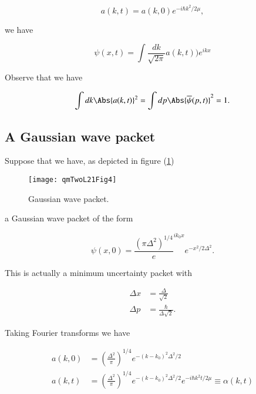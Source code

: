 \begin{equation}\label{eqn:qmTwoL21:290}
a(k, t) = a(k, 0) e^{ -i \hbar k^2/2 \mu},
\end{equation}

we have

\begin{equation}\label{eqn:qmTwoL21:310}
\psi(x, t) = \int \frac{dk}{\sqrt{2 \pi}} a(k, t) ) e^{i k x} 
\end{equation}

Observe that we have

\begin{equation}\label{eqn:qmTwoL21:330}
\int dk \Abs{ a(k, t)}^2 = \int dp \Abs{ \overline{\psi}(p, t)}^2 = 1.
\end{equation}

\subsection{A Gaussian wave packet}

Suppose that we have, as depicted in figure (\ref{fig:qmTwoL21:qmTwoL21Fig4})
\begin{figure}[htp]
   \centering
   \texttt{[image: qmTwoL21Fig4]}
   \caption{Gaussian wave packet.}\label{fig:qmTwoL21:qmTwoL21Fig4}
\end{figure}

a Gaussian wave packet of the form

\begin{equation}\label{eqn:qmTwoL21:350}
\psi(x, 0) = \frac{ (\pi \Delta^2)^{1/4}} e^{i k_0 x} e^{- x^2/2 \Delta^2}.
\end{equation}

This is actually a minimum uncertainty packet with 

\begin{align}\label{eqn:qmTwoL21:370}
\Delta x &= \frac{\Delta}{\sqrt{2}} \\
\Delta p &= \frac{\hbar}{\Delta \sqrt{2}}.
\end{align}

Taking Fourier transforms we have

\begin{align}\label{eqn:qmTwoL21:390}
a(k, 0) &= \left(\frac{\Delta^2}{\pi}\right)^{1/4} e^{-(k - k_0)^2 \Delta^2/2} \\
a(k, t) &= \left(\frac{\Delta^2}{\pi}\right)^{1/4} e^{-(k - k_0)^2 \Delta^2/2} e^{ -i \hbar k^2 t/ 2\mu} \equiv \alpha(k, t)
\end{align}

